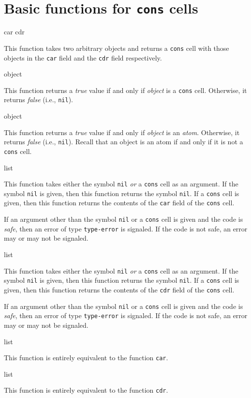 \chapter{Basic functions for \texttt{cons} cells}
\label{chap-basic-cons-functions}

 {car cdr}

This function takes two arbitrary \lisp{} objects and returns a
\texttt{cons} cell with those objects in the \texttt{car} field and
the \texttt{cdr} field respectively.

 {object}

This function returns a \emph{true} value if and only if
\textit{object} is a \texttt{cons} cell.  Otherwise, it returns
\emph{false} (i.e., \texttt{nil}).

 {object}

This function returns a \emph{true} value if and only if
\textit{object} is an \emph{atom}.  Otherwise, it returns \emph{false}
(i.e., \texttt{nil}).  Recall that an object is an atom if and only if
it is not a \texttt{cons} cell.

 {list}

This function takes either the symbol \texttt{nil} \emph{or} a
\texttt{cons} cell as an argument.  If the symbol \texttt{nil} is
given, then this function returns the symbol \texttt{nil}.  If a
\texttt{cons} cell is given, then this function returns the contents
of the \texttt{car} field of the \texttt{cons} cell.

If an argument other than the symbol \texttt{nil} or a \texttt{cons}
cell is given and the code is \emph{safe}, then an error of type
\texttt{type-error} is signaled.  If the code is not safe, an error
may or may not be signaled. 

 {list}

This function takes either the symbol \texttt{nil} \emph{or} a
\texttt{cons} cell as an argument.  If the symbol \texttt{nil} is
given, then this function returns the symbol \texttt{nil}.  If a
\texttt{cons} cell is given, then this function returns the contents
of the \texttt{cdr} field of the \texttt{cons} cell.

If an argument other than the symbol \texttt{nil} or a \texttt{cons}
cell is given and the code is \emph{safe}, then an error of type
\texttt{type-error} is signaled.  If the code is not safe, an error
may or may not be signaled.

 {list}

This function is entirely equivalent to the function \texttt{car}.

 {list}

This function is entirely equivalent to the function \texttt{cdr}.


